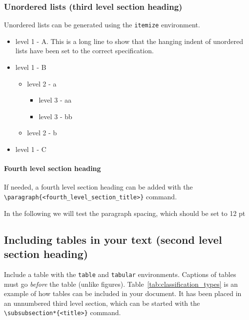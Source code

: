 \documentclass{nato-sto}
\begin{document}
\subsubsection{Unordered lists (third level section heading)}

Unordered lists can be generated using the \verb|itemize| environment.

\begin{itemize}
\item level 1 - A. This is a long line to show that the hanging indent of unordered lists have been set to the correct specification.
\item level 1 - B
	\begin{itemize}
		\item level 2 - a
		\begin{itemize}
			\item level 3 - aa
			\item level 3 - bb
		\end{itemize}
		\item level 2 - b
	\end{itemize}
\item level 1 - C
\end{itemize}

\paragraph{Fourth level section heading}

If needed, a fourth level section heading can be added with the \verb|\paragraph{<fourth_level_section_title>}| command.

In the following we will test the paragraph spacing, which should be set to 12 pt

\lipsum[1]

\lipsum[2]

\lipsum[3]

\newpage

\subsection{Including tables in your text (second level section heading)}

Include a table with the \verb|table| and \verb|tabular| environments. Captions of tables must go \emph{before} the table (unlike figures). Table~\ref{tab:classification_types} is an example of how tables can be included in your document. It has been placed in an unnumbered third level section, which can be started with the \verb|\subsubsection*{<title>}| command.
\end{document}
